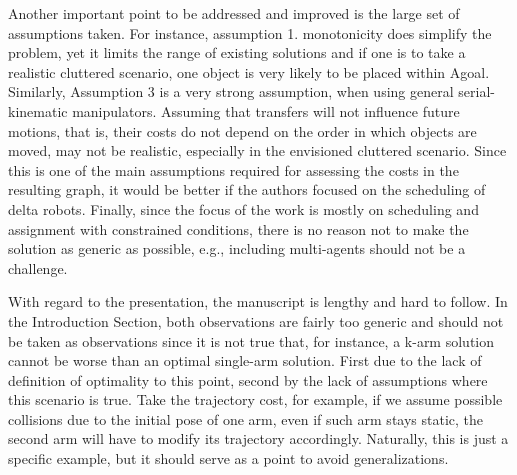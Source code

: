 \documentclass[journal]{IEEEtran}
\begin{document}
	\begin{partt}  
		Another important point to be addressed and improved is the large set of assumptions taken. For instance, assumption 1. monotonicity does simplify the problem, yet it limits the range of existing solutions and if one is to take a realistic cluttered scenario, one object is very likely to be placed within Agoal.  Similarly, Assumption 3 is a very strong assumption, when using general serial-kinematic manipulators. Assuming that transfers will not influence future motions, that is, their costs do not depend on the order in which objects are moved, may not be realistic, especially in the envisioned cluttered scenario. Since this is one of the main assumptions required for assessing the costs in the resulting graph, it would be better if the authors focused on the scheduling of delta robots.
		Finally, since the focus of the work is mostly on scheduling and assignment with constrained conditions, there is no reason not to make the solution as generic as possible, e.g., including multi-agents should not be a challenge.  
	\end{partt}
	
	\begin{partt}
		
		With regard to the presentation, the manuscript is lengthy and hard to follow.
		In the Introduction Section, both observations are fairly too generic and should not be taken as observations since it is not true that, for instance, a k-arm solution cannot be worse than an optimal single-arm solution. First due to the lack of definition of optimality to this point, second by the lack of assumptions where this scenario is true. Take the trajectory cost, for example, if we assume possible collisions due to the initial pose of one arm, even if such arm stays static, the second arm will have to modify its trajectory accordingly. Naturally, this is just a specific example, but it should serve as a point to avoid generalizations.  
	\end{partt}
	
\end{document}
